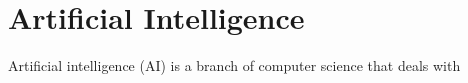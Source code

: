 \section{Artificial Intelligence}
\label{sec:ai}

Artificial intelligence (AI) is a branch of computer science that deals with



